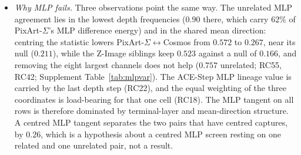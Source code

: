 \documentclass[11pt]{article}
\begin{document}
\begin{itemize}
 \item \emph{Why MLP fails.} Three observations point the same way. The unrelated MLP agreement lies in the lowest depth frequencies ($0.90$ there, which carry $62\%$ of PixArt-$\Sigma$'s MLP difference energy) and in the shared mean direction: centring the statistic lowers PixArt-$\Sigma$$\leftrightarrow$Cosmos from $0.572$ to $0.267$, near its null ($0.211$), while the Z-Image siblings keep $0.523$ against a null of $0.166$, and removing the eight largest channels does not help ($0.757$ unrelated; RC55, RC42; Supplement Table~\ref{tab:mlpvar}). The ACE-Step MLP lineage value is carried by the last depth step (RC22), and the equal weighting of the three coordinates is load-bearing for that one cell (RC18). The MLP tangent on all rows is therefore dominated by terminal-layer and mean-direction structure. A centred MLP tangent separates the two pairs that have centred captures, by $0.26$, which is a hypothesis about a centred MLP screen resting on one related and one unrelated pair, not a result.
\end{itemize}
\end{document}
